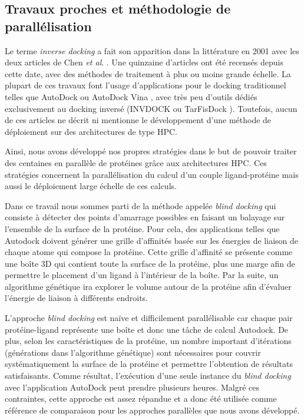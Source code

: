 \subsection{Travaux proches et méthodologie de parallélisation}

Le terme \textit{inverse docking} a fait son apparition dans la littérature en 2001 avec les deux articles de Chen \textit{et al}. \cite{Chen2001,Chen2001b}. Une quinzaine d'articles ont été recensés depuis cette date, avec des méthodes de traitement à plus ou moins grande échelle. La plupart de ces travaux font l'usage d'applications pour le docking traditionnel telles que AutoDock \cite{Steffen07} ou AutoDock Vina \cite{Lauro2011,Lauro2012}, avec très peu d'outils dédiés exclusivement au docking inversé (INVDOCK \cite{Chen2001,Chen2001b} ou TarFisDock \cite{Li2006}). Toutefois, aucun de ces articles ne décrit ni mentionne le développement d'une méthode de déploiement sur des architectures de type HPC.

Ainsi, nous avons développé nos propres stratégies dans le but de pouvoir traiter des centaines en parallèle de protéines grâce aux architectures HPC.
Ces stratégies concernent la parallélisation du calcul d'un couple ligand-protéine mais aussi le déploiement large échelle de ces calculs. 

Dans ce travail nous sommes parti de la méthode appelée \textit{blind docking} qui consiste à détecter des points d'amarrage possibles en faisant un balayage sur l'ensemble de la surface de la protéine. Pour cela, des applications telles que Autodock doivent générer une grille d'affinités basée sur les énergies de liaison de chaque atome qui compose la protéine. Cette grille d'affinité se présente comme une boîte 3D qui contient toute la surface de la protéine, plus une marge afin de permettre le placement d'un ligand à l'intérieur de la boîte. Par la suite, un algorithme génétique ira explorer le volume autour de la protéine afin d'évaluer l'énergie de liaison à différents endroits. 

L'approche \textit{blind docking} est naïve et difficilement parallélisable car chaque pair protéine-ligand représente une boîte et donc une tâche de calcul Autodock. De plus, selon les caractéristiques de la protéine, un nombre important d'itérations (générations dans l'algorithme génétique) sont nécessaires pour couvrir systématiquement la surface de la protéine et permettre l'obtention de résultats satisfaisants. Comme résultat, l'exécution d'une seule instance du \textit{blind docking} avec l'application AutoDock peut prendre plusieurs heures. Malgré ces contraintes, cette approche est assez répandue et a donc été utilisée comme référence de comparaison pour les approches parallèles que nous avons développé.

